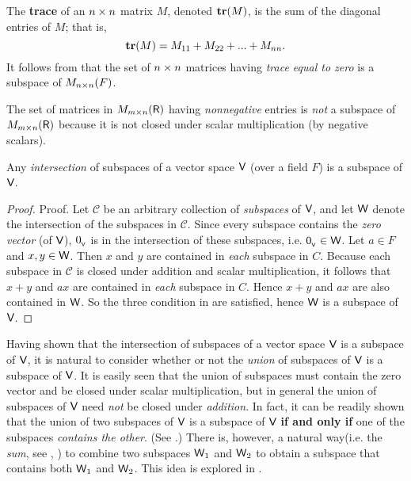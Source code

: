 \begin{example} \label{example 1.3.4}
The \textbf{trace} of an \(n \times n\) matrix \(M\), denoted \(\textbf{tr}(M)\), is the sum of the diagonal entries of \(M\);
that is,
\[
    \textbf{tr}(M) = M_{11} + M_{22} + ... + M_{nn}.
\]
It follows from  that the set of \(n \times n\) matrices having \emph{trace equal to zero} is a subspace of \(M_{n \times n}(F)\).
\end{example}

\begin{example} \label{example 1.3.5}
The set of matrices in \(M_{m \times n}(\textsf{R})\) having \emph{nonnegative} entries is \emph{not} a subspace of \(M_{m \times n}(\textsf{R})\) because it is not closed under scalar multiplication (by negative scalars).
\end{example}

\begin{theorem} \label{thm 1.4}
Any \emph{intersection} of subspaces of a vector space \(\textsf{V}\) (over a field \(F\)) is a subspace of \(\textsf{V}\).
\end{theorem}

\begin{proof}
Proof. Let \(\mathcal{C}\) be an arbitrary collection of \emph{subspaces} of \(\textsf{V}\), and let \(\textsf{W}\) denote the intersection of the subspaces in \(\mathcal{C}\).
Since every subspace contains the \emph{zero vector} (of \(\textsf{V}\)), \(0_{_{\textsf{V}}}\) is in the intersection of these subspaces, i.e. \(0_{_{\textsf{V}}} \in \textsf{W}\).
Let \(a \in F\) and \(x, y \in \textsf{W}\).
Then \(x\) and \(y\) are contained in \emph{each} subspace in \(C\). Because each subspace in \(\mathcal{C}\) is closed under addition and scalar multiplication, it follows that \(x + y\) and \(ax\) are contained in \emph{each} subspace in \(C\).
Hence \(x + y\) and \(ax\) are also contained in \(\textsf{W}\).
So the three condition in  are satisfied, hence \(\textsf{W}\) is a subspace of \(\textsf{V}\).
\end{proof}

Having shown that the intersection of subspaces of a vector space \(\textsf{V}\) is a subspace of \(\textsf{V}\), it is natural to consider whether or not the \emph{union} of subspaces of \(\textsf{V}\) is a subspace of \(\textsf{V}\).
It is easily seen that the union of subspaces must contain the zero vector and be closed under scalar multiplication, but in general the union of subspaces of \(\textsf{V}\) need \emph{not} be closed under \emph{addition}.
In fact, it can be readily shown that the union of two subspaces of \(\textsf{V}\) is a subspace of \(\textsf{V}\) \textbf{if and only if} one of the subspaces \emph{contains the other}. (See .)
There is, however, a natural way(i.e. the \emph{sum}, see , )  to combine two subspaces \(\textsf{W}_1\) and \(\textsf{W}_2\) to obtain a subspace that contains both \(\textsf{W}_1\) and \(\textsf{W}_2\).
This idea is explored in .
